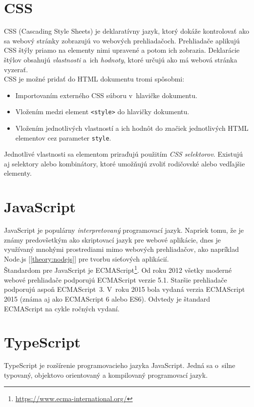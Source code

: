 \section{CSS}
CSS (Cascading Style Sheets) je deklaratívny jazyk, ktorý dokáže kontrolovať ako sa webový stránky zobrazujú vo webových prehliadačoch. Prehliadače aplikujú CSS štýly priamo na elementy nimi upravené a potom ich zobrazia. Deklarácie štýlov obsahujú \emph{vlastnosti} a~ich \emph{hodnoty}, ktoré určujú ako má webová stránka vyzerať. \cite{MDN} \\

\noindent CSS je možné pridať do HTML dokumentu tromi spôsobmi: 
\begin{itemize}
	\item Importovaním externého CSS súboru v~hlavičke dokumentu.
	\item Vložením medzi element \texttt{<style>} do hlavičky dokumentu.
	\item Vložením jednotlivých vlastností a ich hodnôt do značiek jednotlivých HTML elementov cez parameter \texttt{style}.
\end{itemize}

\noindent Jednotlivé vlastnosti sa elementom priraďujú použitím \emph{CSS selektorov}. Existujú aj selektory alebo kombinátory, ktoré umožňujú zvoliť rodičovské alebo vedľajšie elementy. \cite{MDN} \\

\section{JavaScript}
JavaScript je populárny \emph{interpretovaný} programovací jazyk. Napriek tomu, že je známy predovšetkým ako skriptovací jazyk pre webové aplikácie, dnes je využívaný mnohými prostrediami mimo webových prehliadačov, ako napríklad Node.js [\ref{theory:nodejs}] pre tvorbu sieťových aplikácií. \cite{MDN} \\

\noindent Štandardom pre JavaScript je ECMAScript\footnote{\href{https://www.ecma-international.org/}{https://www.ecma-international.org/}}. Od roku 2012 všetky moderné webové prehliadače podporujú ECMAScript verzie 5.1. Staršie prehliadače podporujú aspoň ECMAScript~3. V~roku 2015 bola vydaná verzia ECMAScript 2015 (známa aj ako ECMAScript 6 alebo ES6). Odvtedy je štandard ECMAScript na cykle ročných vydaní. \cite{MDN}

\section{TypeScript}
\label{theory:typescript}
TypeScript je rozšírenie programovacieho jazyka JavaScript. Jedná sa o~silne typovaný, objektovo orientovaný a kompilovaný programovací jazyk. \cite{TSWeb}

